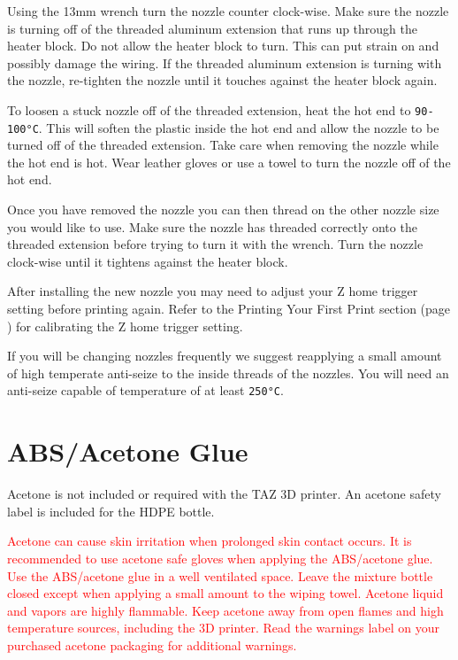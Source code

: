 Using the 13mm wrench turn the nozzle counter clock-wise. Make sure the nozzle is turning off of the threaded aluminum extension that runs up through the heater block. Do not allow the heater block to turn. This can put strain on and possibly damage the wiring. If the threaded aluminum extension is turning with the nozzle, re-tighten the nozzle until it touches against the heater block again.

To loosen a stuck nozzle off of the threaded extension, heat the hot end to \texttt{90-100°C}. This will soften the plastic inside the hot end and allow the nozzle to be turned off of the threaded extension. Take care when removing the nozzle while the hot end is hot. Wear leather gloves or use a towel to turn the nozzle off of the hot end.

Once you have removed the nozzle you can then thread on the other nozzle size you would like to use. Make sure the nozzle has threaded correctly onto the threaded extension before trying to turn it with the wrench. Turn the nozzle clock-wise until it tightens against the heater block.

After installing the new nozzle you may need to adjust your Z home trigger setting before printing again. Refer to the Printing Your First Print section (page \pageref{firstprint}) for calibrating the Z home trigger setting.

If you will be changing nozzles frequently we suggest reapplying a small amount of high temperate anti-seize to the inside threads of the nozzles. You will need an anti-seize capable of temperature of at least \texttt{250°C}.

\section{ABS/Acetone Glue}
Acetone is not included or required with the TAZ 3D printer. An acetone safety label is included for the HDPE bottle.

\textcolor{red}{Acetone can cause skin irritation when prolonged skin contact occurs. It is recommended to use acetone safe gloves when applying the ABS/acetone glue. Use the ABS/acetone glue in a well ventilated space. Leave the mixture bottle closed except when applying a small amount to the wiping towel. Acetone liquid and vapors are highly flammable. Keep acetone away from open flames and high temperature sources, including the 3D printer. Read the warnings label on your purchased acetone packaging for additional warnings.}

